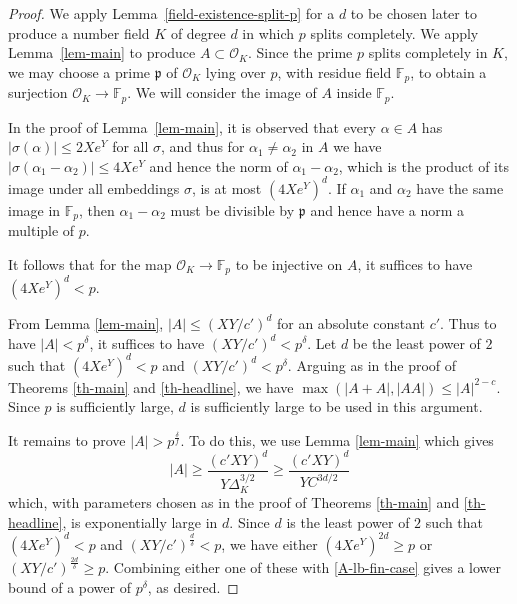 \documentclass{amsart}
\numberwithin{equation}{section}
\newcommand{\abs}[1]{\mathopen{}\left| #1\mathclose{}\right|}
\begin{document}
\begin{proof} We apply Lemma~\ref{field-existence-split-p} for a $d$ to be chosen later to produce a number field $K$ of degree $d$ in which $p$ splits completely. We apply Lemma~\ref{lem-main} to produce $A \subset \mathcal O_K$. Since the prime $p$ splits completely in $K$, we may choose a prime $\mathfrak p$ of $\mathcal O_K$ lying over $p$, with residue field $\mathbb F_p$, to obtain a surjection $\mathcal O_K \to \mathbb F_p$. We will consider the image of $A$ inside $\mathbb F_p$.

In the proof of Lemma~\ref{lem-main}, it is observed that every $\alpha \in A$ has $\abs{\sigma(\alpha)}\leq 2X e^Y$ for all $\sigma$, and thus for $\alpha_1 \neq \alpha_2$ in $A$ we have $\abs{\sigma(\alpha_1-\alpha_2)}\leq 4 X e^Y$ and hence the norm of $\alpha_1-\alpha_2$, which is the product of its image under all embeddings $\sigma$, is at most $(4X e^Y)^d$. If $\alpha_1 $ and $\alpha_2$ have the same image in $\mathbb F_p$, then $\alpha_1-\alpha_2$ must be divisible by $\mathfrak p$ and hence have a norm a multiple of $p$.

It follows that for the map $\mathcal O_K \to\mathbb F_p$ to be injective on $A$, it suffices to have $(4 Xe^Y)^d <p$.

From Lemma \ref{lem-main}, $\abs{A} \leq (XY/c')^d$ for an absolute constant $c'$. Thus to have $\abs{A}<p^\delta$, it suffices to have $(XY/c')^{d}<p^\delta$. Let $d$ be the least power of $2$ such that $(4 Xe^Y)^d <p$ and $(XY/c')^{d}<p^\delta$. Arguing as in the proof of Theorems \ref{th-main} and \ref{th-headline}, we have $\max(\abs{A+A},\abs{AA})\leq \abs{A}^{2-c}$. Since $p$ is sufficiently large, $d$ is sufficiently large to be used in this argument.

It remains to prove $\abs{A}> p^{\frac{\delta}{f}}$. To do this, we use Lemma \ref{lem-main} which gives
\begin{equation}\label{A-lb-fin-case} \abs{A} \geq \frac{ (c' XY)^d}{ Y \Delta_K^{3/2}} \geq  \frac{ (c' XY)^d}{ Y C^{3d/2}}\end{equation} which, with parameters chosen as in the proof of Theorems \ref{th-main} and \ref{th-headline}, is exponentially large in $d$. Since $d$ is the least power of $2$ such that $(4 Xe^Y)^d <p$ and $(XY/c')^{\frac{d}{\delta}}<p$, we have either $(4 Xe^Y)^{2d} \geq p$ or $(XY/c')^{\frac{2d}{\delta}}\geq p$. Combining either one of these with \eqref{A-lb-fin-case} gives a lower bound of a power of $p^\delta$, as desired.\end{proof}
\end{document}
